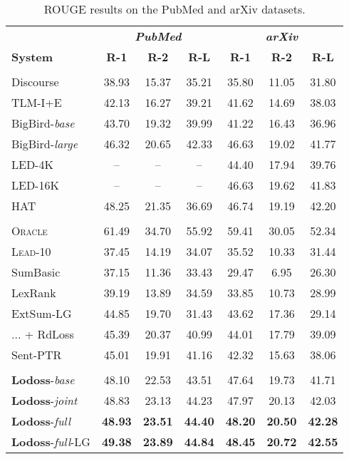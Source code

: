\documentclass[11pt]{article}
\begin{document}
\begin{table}[t]
\setlength{\tabcolsep}{3pt}
\renewcommand{\arraystretch}{1.15}
\centering
\begin{footnotesize}
\begin{tabular}{|l|ccc|ccc|}
\hline
& \multicolumn{3}{c|}{\textbf{\textsl{PubMed}}} & \multicolumn{3}{c|}{\textbf{\textsl{arXiv}}}\\
\textbf{System} & \textbf{R-1} & \textbf{R-2} & \textbf{R-L} & \textbf{R-1} & \textbf{R-2} & \textbf{R-L} \\
\hline
\hline
\rowcolor{gray!10}
\multicolumn{7}{|c|}{\textbf{\textsl{Abstractive Systems}}} \\
Discourse & 38.93 & 15.37 & 35.21   &  35.80 & 11.05 & 31.80 \\
TLM-I+E & 42.13 & 16.27 & 39.21     & 41.62 & 14.69 & 38.03 \\
BigBird-\emph{base} & 43.70 & 19.32 & 39.99     & 41.22 & 16.43 & 36.96 \\
BigBird-\emph{large} & 46.32 & 20.65 & 42.33    & 46.63 & 19.02 & 41.77 \\
LED-4K & -- & -- & -- & 44.40 & 17.94 & 39.76 \\
LED-16K & -- & -- & -- & 46.63 & {19.62} & 41.83 \\
HAT & 48.25 & 21.35 & 36.69    & 46.74 & 19.19 & {42.20} \\
\hline
\hline
\rowcolor{gray!10}
\multicolumn{7}{|c|}{\textbf{\textsl{Extractive Systems}}} \\
\textsc{Oracle} & 61.49 & 34.70 & 55.92   & 59.41 & 30.05 & 52.34 \\
\textsc{Lead}-10 & 37.45 & 14.19 & 34.07   & 35.52 & 10.33 & 31.44 \\
SumBasic & 37.15 & 11.36 & 33.43    & 29.47 & 6.95 & 26.30 \\
LexRank & 39.19 & 13.89 & 34.59    & 33.85 & 10.73 & 28.99 \\
ExtSum-LG & 44.85 & 19.70 & 31.43    & 43.62 & 17.36 & 29.14 \\
... + RdLoss & 45.39 & 20.37 & 40.99    & 44.01 & 17.79 & 39.09 \\
Sent-PTR & 45.01 & 19.91 & 41.16    & 42.32 & 15.63 & 38.06  \\ 
\hline
\hline
\rowcolor{gray!10}
\multicolumn{7}{|c|}{\textbf{\textsl{Our System (Extractive)}}} \\
\textbf{Lodoss}-\emph{base} & 48.10 & 22.53 & 43.51     & 47.64 & 19.73 & 41.71 \\ 
\textbf{Lodoss}-\emph{joint} & 48.83 & 23.13 & 44.23    & 47.97 & 20.13 & 42.03 \\ 
\textbf{Lodoss}-\emph{full} & \textbf{48.93} & \textbf{23.51} & \textbf{44.40}    & \textbf{48.20} & \textbf{20.50} & \textbf{42.28}\\ 
\textbf{Lodoss}-\emph{full}-LG & \textbf{49.38} & \textbf{23.89} & \textbf{44.84}    & \textbf{48.45} & \textbf{20.72} & \textbf{42.55}\\ 
\hline
\end{tabular}
\end{footnotesize}
\vspace{-0.05in}
\caption{ROUGE results on the PubMed and arXiv datasets. 
}
\label{tab:results_rouge_arxiv_pubmed_16k}
\end{table}
\end{document}
